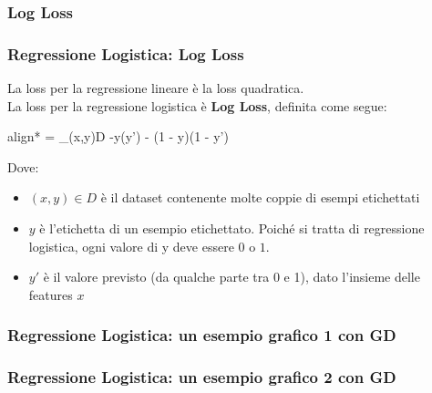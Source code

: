 \subsubsection[Log Loss]{Log Loss}

\begin{frame}
	
	\frametitle{Regressione Logistica: Log Loss}

	La loss per la regressione lineare è la loss quadratica.\\
	La loss per la regressione logistica è \textbf{Log Loss}, definita come segue:
	\begin{empheq}[box=\fcolorbox{blue!40!black!60}{yellow!10}]{align*}
	 = \sum_{(x,y)\in D} -y\log(y') - (1 - y)\log(1 - y')
	\end{empheq}
	
	Dove:
	\begin{itemize}
		\item $(x,y)\in D$ è il dataset contenente molte coppie di esempi etichettati
		\item $y$ è l'etichetta di un esempio etichettato. Poiché si tratta di regressione logistica, ogni valore di y deve essere $0$ o $1$.
		\item $y'$ è il valore previsto (da qualche parte tra 0 e 1), dato l'insieme delle features $x$
	\end{itemize}
	
\end{frame}


\begin{frame}
	
	\frametitle{Regressione Logistica: un esempio grafico 1 con GD}
	
		\centering

\end{frame}


\begin{frame}
	
	\frametitle{Regressione Logistica: un esempio grafico 2 con GD}
	
		\centering

\end{frame}


